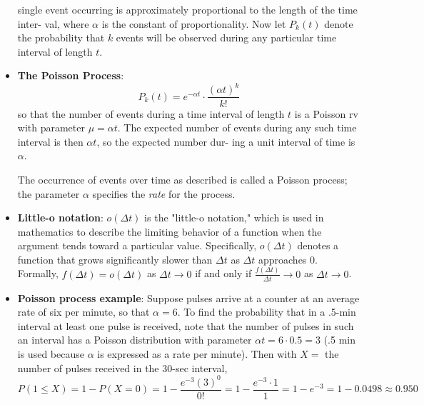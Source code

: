 \documentclass{report}
\begin{document}
\begin{itemize}
        single event occurring is approximately proportional to the length of the time inter-
        val, where $\alpha$ is the constant of proportionality. Now let $P_k(t)$ denote the probability
        that $k$ events will be observed during any particular time interval of length $t$.
    \item \textbf{The Poisson Process}:
        \[ P_k(t) = e^{-\alpha t} \cdot \frac{(\alpha t)^k}{k!} \]
        so that the number of events during a time interval of length $t$ is a Poisson rv with parameter
        $\mu = \alpha t$. The expected number of events during any such time interval is then $\alpha t$, so the expected number dur-
        ing a unit interval of time is $\alpha$.

        The occurrence of events over time as described is called a Poisson process; the parameter $\alpha$ specifies the \textit{rate} for the process.
    \item \textbf{Little-o notation}:
        \(o(\Delta t)\) is the "little-o notation," which is used in mathematics to describe the limiting behavior of a function when the argument tends toward a particular value. Specifically, \(o(\Delta t)\) denotes a function that grows significantly slower than \(\Delta t\) as \(\Delta t\) approaches 0.
        \bigbreak \noindent 
        Formally,
        \(f(\Delta t) = o(\Delta t)\) as \(\Delta t \to 0\) if and only if \(\frac{f(\Delta t)}{\Delta t} \to 0\) as \(\Delta t \to 0\).
    \item \textbf{Poisson process example}:
        \bigbreak \noindent 
        Suppose pulses arrive at a counter at an average rate of six per minute, so that \(\alpha = 6\).
        To find the probability that in a .5-min interval at least one pulse is received, note that
        the number of pulses in such an interval has a Poisson distribution with parameter
        \(\alpha t = 6 \cdot 0.5 = 3\) (.5 min is used because \(\alpha\) is expressed as a rate per minute). Then with
        \(X =\) the number of pulses received in the 30-sec interval,
        \bigbreak \noindent 
        \[
            P(1 \leq X) = 1 - P(X = 0) = 1 - \frac{e^{-3} (3)^0}{0!} = 1 - \frac{e^{-3} \cdot 1}{1} = 1 - e^{-3} = 1 - 0.0498 \approx 0.950
        \]


    \end{itemize}

    \pagebreak 
\end{document}
